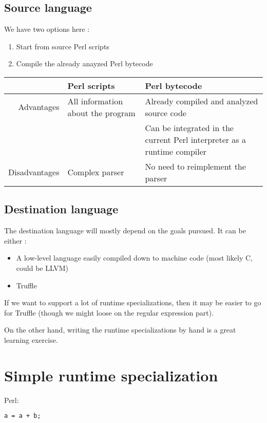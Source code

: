 \documentclass[11pt,a4paper]{report}
\newcommand{\pgl}[1]{\textsf{#1}}
\begin{document}
\subsection{Source language}

We have two options here :
\begin{enumerate}
\item Start from source Perl scripts
\item Compile the already anayzed Perl bytecode
\end{enumerate}

\begin{tabular}{|r|l|l|}
\hline
	& Perl scripts	& Perl bytecode \\
\hline
Advantages	& All information about the program	& Already compiled and analyzed source code \\
	&	& Can be integrated in the current Perl interpreter as a runtime compiler \\
\hline
Disadvantages	& Complex parser	& No need to reimplement the parser \\
\hline
\end{tabular}

\subsection{Destination language}

The destination language will mostly depend on the goals pursued. It can be either :
\begin{itemize}
\item A low-level language easily compiled down to machine code (most likely \pgl{C}, could be \pgl{LLVM})
\item Truffle
\end{itemize}

If we want to support a lot of runtime specializations, then it may be easier to go for Truffle (though we might loose on the regular expression part).

On the other hand, writing the runtime specializations by hand is a great learning exercise.

\section{Simple runtime specialization}


Perl:
\begin{lstlisting}[language=perl]
a = a + b;
\end{lstlisting}
\end{document}
